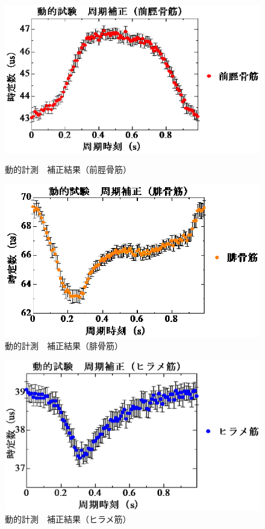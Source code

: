 \begin{figure}[h]
    \begin{center}
        \includegraphics[width=0.75\columnwidth,clip]{4_consideration/min/zenkei.eps}
    \end{center}
    \caption{動的計測　補正結果（前脛骨筋）}
    \label{min-rc1}
    \begin{center}
        \includegraphics[width=0.75\columnwidth,clip]{4_consideration/min/hikotsu.eps}
    \end{center}
    \caption{動的計測　補正結果（腓骨筋）}
    \label{min-rc2}
\end{figure}
\begin{figure}[t]
    \begin{center}
        \includegraphics[width=0.75\columnwidth,clip]{4_consideration/min/hirame.eps}
    \end{center}
    \caption{動的計測　補正結果（ヒラメ筋）}
    \label{min-rc3}
\end{figure}
